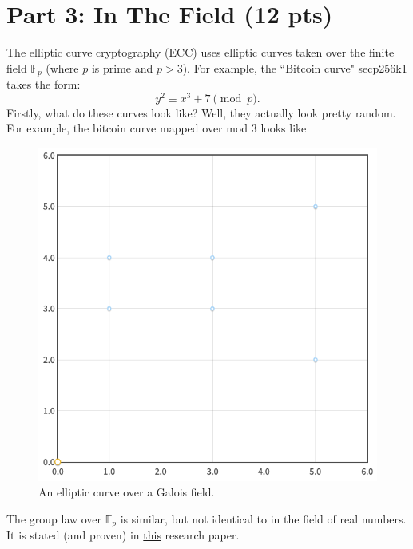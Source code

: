 \documentclass{article}
\begin{document}
\section*{Part 3: In The Field (12 pts)}
    The elliptic curve cryptography (ECC) uses elliptic curves taken over the finite field $\mathbb{F}_{p}$ (where $p$ is prime and $p > 3$). For example, the ``Bitcoin curve" secp256k1 takes the form: $$y^{2} \equiv x^{3} + 7 \pmod{p}.$$ Firstly, what do these curves look like? Well, they actually look pretty random. For example, the bitcoin curve mapped over mod $3$ looks like

    \begin{figure}[htbp]
        \centering
        \includegraphics[scale = 0.4]{images/generate_points.png}
        \caption{An elliptic curve over a Galois field.}
        \label{fig:generate_points}
    \end{figure}

    The group law over $\mathbb{F}_{p}$ is similar, but not identical to in the field of real numbers. It is stated (and proven) in \href{https://arxiv.org/pdf/1710.00214.pdf}{this} research paper.
\end{document}
